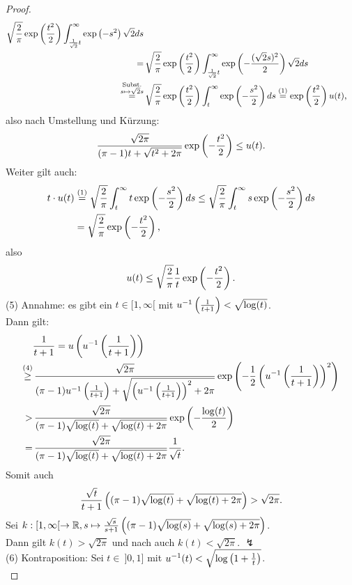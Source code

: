 \begin{proof}
\begin{align*}
\sqrt{\frac 2 \pi}\exp\left(\frac {t^2} 2 \right)
\int_{\frac 1 {\sqrt 2} t}^\infty \exp\left(-s^2 \right)\sqrt 2 ds\\
= & \,\sqrt{\frac 2 \pi}\exp\left(\frac {t^2} 2 \right)
\int_{\frac 1{\sqrt 2}t}^\infty 
\exp\left(-\frac{(\sqrt 2s)^2}{2}\right)\sqrt 2 ds\\
\overset{\substack{\text{Subst.}\\ s \mapsto \sqrt 2 s}}=&\,
\sqrt{\frac 2 \pi}\exp\left(\frac {t^2} 2 \right)
\int_{t}^\infty \exp\left(- \frac{s^2}2 \right)ds
\overset{(1)}= \exp\left( \frac{t^2} 2 \right) u(t)\text,\end{align*}
also nach Umstellung und Kürzung:
\[\frac{\sqrt{2\pi}}{(\pi-1)t+\sqrt{t^2+2\pi}}\exp\left(-\frac{t^2}2\right)
 \le u(t)\text.\]
Weiter gilt auch:
\begin{align*}
t\cdot u(t) &\overset{(1)}= 
\sqrt{\frac 2 \pi} \int_t^\infty t \exp\left(- \frac {s^2}2 \right)ds
\le \sqrt{\frac 2 \pi} \int_t^\infty s \exp\left(- \frac {s^2}2 \right)ds\\
&= \sqrt{\frac 2 \pi}\exp\left(- \frac{t^2}2 \right)\text,
\end{align*}
also
\[u(t)\le\sqrt{\frac 2 \pi} \frac 1 t \exp\left(- \frac{t^2}2 \right)\text.\]
(5) Annahme: es gibt ein $t \in [1, \infty[$ mit 
$u^{-1}\left(\frac 1 {t+1} \right) < \sqrt{\log(t)}$.\\
Dann gilt:
\begin{align*}
&\frac 1 {t+1} = u\left(u^{-1}\left(\frac 1{t+1} \right)\right)\\
 \overset{(4)}\ge &\,
\frac{\sqrt{2\pi}}{(\pi-1)u^{-1}\left(\frac 1{t+1}\right)
+ \sqrt{\left(u^{-1}\left(\frac 1{t+1}\right)\right)^2+2\pi}}
\exp\left(-\frac 1 2 \left(u^{-1}\left(\frac 1{t+1}\right)\right)^2\right)\\
 >&\, \frac{\sqrt{2\pi}}{(\pi-1)\sqrt{\log(t)} 
+ \sqrt{\log(t)+2\pi}}\exp\left(-\frac{\log(t)}2\right)\\
=&\, \frac{\sqrt{2\pi}}{(\pi-1)\sqrt{\log(t)} 
+ \sqrt{\log(t)+2\pi}}\frac 1 {\sqrt t}\text.
\end{align*}
Somit auch
\[ \frac{\sqrt t}{t+1} \left((\pi-1)\sqrt{\log(t)} 
+ \sqrt{\log(t)+2\pi} \right) > \sqrt{2\pi}\text.\]
Sei $k: [1, \infty[ \rightarrow \mathbb{R}, 
s \mapsto \frac{\sqrt s}{s+1} \left((\pi-1)\sqrt{\log(s)} 
+ \sqrt{\log(s)+2\pi} \right)$.\\
Dann gilt $k(t) > \sqrt{2\pi}$ und nach
 auch $k(t) <\sqrt{2\pi}$. $\lightning$\\
(6) Kontraposition:
Sei $t\in \!\ ]0, 1]$ mit $u^{-1}(t)<\sqrt{\log\left(1+\frac 1 t\right)}$.\\

\end{proof}
